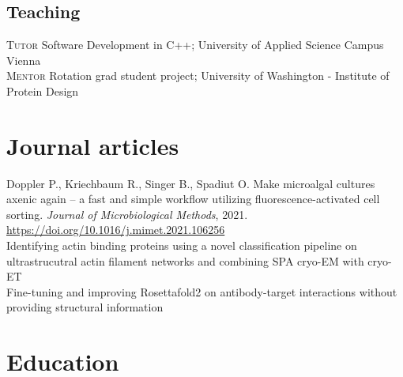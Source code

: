 \documentclass[14pt]{article} %
\begin{document}
\subsection*{Teaching}

\textsc{Tutor} Software Development in C++; University of Applied Science Campus Vienna\\

\textsc{Mentor} Rotation grad student project; University of Washington - Institute of Protein Design



\section*{Journal articles}

 Doppler P., Kriechbaum R., Singer B., Spadiut O. Make microalgal cultures axenic again – a fast and simple workflow utilizing fluorescence-activated cell sorting. \emph{Journal of Microbiological Methods}, 2021. \url{https://doi.org/10.1016/j.mimet.2021.106256} \\

 Identifying actin binding proteins using a novel classification pipeline on ultrastrucutral actin filament networks and combining SPA cryo-EM with cryo-ET\\

 Fine-tuning and improving Rosettafold2 on antibody-target interactions without providing structural information\\

\newpage

\section*{Education}
\end{document}
